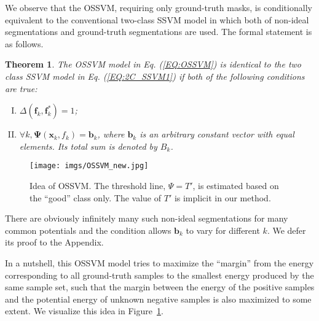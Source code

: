 \documentclass[10pt,journal,compsoc]{newIEEEtran}
\newtheorem{theorem}{Theorem}[section]
\begin{document}
We observe that the OSSVM, requiring only ground-truth masks, is conditionally equivalent to the conventional two-class SSVM model in which both of non-ideal segmentations and ground-truth segmentations are used. The formal statement is as follows.
\begin{theorem}\label{THM:2COEQ}
The OSSVM model in Eq. (\ref{EQ:OSSVM}) is identical to the two class SSVM model in Eq. (\ref{EQ:2C_SSVM1}) if both of the following conditions are true:
\begin{enumerate}[(I)]
	\item $\Delta(\mathbf{f}_k,\mathbf{f}^*_k)=1$;
	\item $\forall k, \mathbf{\Psi}(\mathbf{x}_k,f_k)=\mathbf{b}_k$, where $\mathbf{b}_k$ is an arbitrary constant vector with equal elements. Its total sum is denoted by ${B}_k$.
\end{enumerate}
\end{theorem}\begin{figure}[!t]
	\centering
	\texttt{[image: imgs/OSSVM\_new.jpg]} 
	\caption{Idea of OSSVM. The threshold line, $\Psi=T'$, is estimated based on the ``good'' class only. The value of $T'$ is implicit in our method.}\label{fig:OSSVM}
\end{figure}

There are obviously infinitely many such non-ideal segmentations for many common potentials and the condition allows $\mathbf{b}_k$ to vary for different $k$. We defer its proof to the Appendix.

In a nutshell, this OSSVM model tries to maximize the ``margin'' from the energy corresponding to all ground-truth samples to the smallest energy produced by the same sample set, such that the margin between the energy of the positive samples and the potential energy of unknown negative samples is also maximized to some extent. We visualize this idea in Figure~\ref{fig:OSSVM}. 
\end{document}

